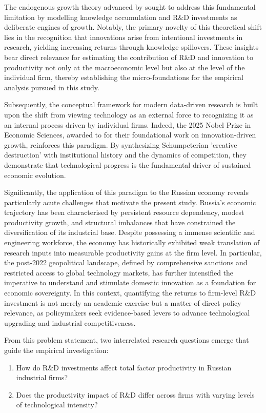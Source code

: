 \documentclass[a4paper, 12pt]{article}
\begin{document}
The endogenous growth theory advanced by \textcite{romer1990endogenous} sought to address this fundamental limitation by modelling knowledge accumulation and R\&D investments as deliberate engines of growth. Notably, the primary novelty of this theoretical shift lies in the recognition that innovations arise from intentional investments in research, yielding increasing returns through knowledge spillovers. These insights bear direct relevance for estimating the contribution of R\&D and innovation to productivity not only at the macroeconomic level but also at the level of the individual firm, thereby establishing the micro-foundations for the empirical analysis pursued in this study.

Subsequently, the conceptual framework for modern data-driven research is built upon the shift from viewing technology as an external force to recognizing it as an internal process driven by individual firms. Indeed, the 2025 Nobel Prize in Economic Sciences, awarded to \textcite{mokyr2011gifts,aghion1990model} for their foundational work on innovation-driven growth, reinforces this paradigm. By synthesizing Schumpeterian 'creative destruction' with institutional history and the dynamics of competition, they demonstrate that technological progress is the fundamental driver of sustained economic evolution.

Significantly, the application of this paradigm to the Russian economy reveals particularly acute challenges that motivate the present study. Russia’s economic trajectory has been characterised by persistent resource dependency, modest productivity growth, and structural imbalances that have constrained the diversification of its industrial base. Despite possessing a immense scientific and engineering workforce, the economy has historically exhibited weak translation of research inputs into measurable productivity gains at the firm level. In particular, the post-2022 geopolitical landscape, defined by comprehensive sanctions and restricted access to global technology markets, has further intensified the imperative to understand and stimulate domestic innovation as a foundation for economic sovereignty. In this context, quantifying the returns to firm-level R\&D investment is not merely an academic exercise but a matter of direct policy relevance, as policymakers seek evidence-based levers to advance technological upgrading and industrial competitiveness.

From this problem statement, two interrelated research questions emerge that guide the empirical investigation:
\begin{enumerate}
\item How do R\&D investments affect total factor productivity in Russian industrial firms?
\item Does the productivity impact of R\&D differ across firms with varying levels of technological intensity?
\end{enumerate}
\end{document}
